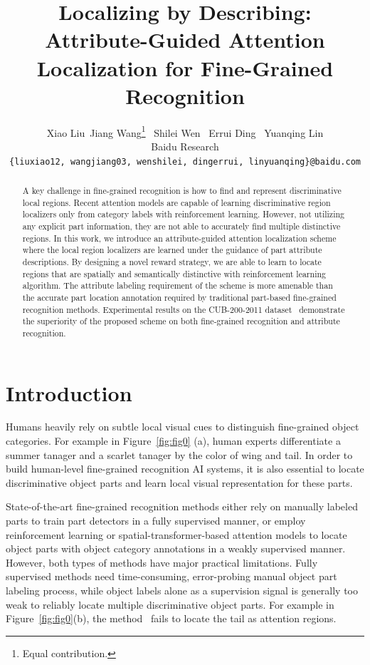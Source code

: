 \documentclass{article}
\title{Localizing by Describing: Attribute-Guided Attention Localization for Fine-Grained Recognition}
\author{
  Xiao Liu\footnotemark[1] \hspace{0.15in}~Jiang Wang\thanks{Equal contribution.}\hspace{0.15in} ~Shilei Wen\hspace{0.15in} ~Errui Ding \hspace{0.15in}  ~Yuanqing Lin\\
  Baidu Research\\
  \texttt{\{liuxiao12, wangjiang03, wenshilei, dingerrui, linyuanqing\}@baidu.com} \\
}
\begin{document}

\maketitle

\setlength{\textfloatsep}{8pt}

\begin{abstract}
A key challenge in fine-grained recognition is how to find and represent discriminative local regions.
Recent attention models are capable of learning discriminative region localizers only from category labels with reinforcement learning. However, not utilizing any explicit part information, they are not able to accurately find multiple distinctive regions.
In this work, we introduce an attribute-guided attention localization scheme where the local region localizers are learned under the guidance of part attribute descriptions.
By designing a novel reward strategy, we are able to learn to locate regions that are spatially and semantically distinctive with reinforcement learning algorithm. The attribute labeling requirement of the scheme is more amenable than the accurate part location annotation required by traditional part-based fine-grained recognition methods.
Experimental results on the CUB-200-2011 dataset~\cite{bd6} demonstrate the superiority of the proposed scheme on both fine-grained recognition and attribute recognition.
\end{abstract}

\section{Introduction}
Humans heavily rely on subtle local visual cues to distinguish fine-grained object categories.
For example in Figure~\ref{fig:fig0} (a), human experts differentiate a summer tanager and a scarlet tanager by the color of wing and tail.  In order to build human-level fine-grained recognition AI systems, it is also essential to locate discriminative object parts and learn local visual representation for these parts.

State-of-the-art fine-grained recognition methods \cite{bd11,bd13} either rely on manually labeled parts to train part detectors in a fully supervised manner, or employ reinforcement learning or spatial-transformer-based attention models \cite{bd3,nips1} to locate object parts with object category annotations in a weakly supervised manner. However, both types of methods have major practical limitations.
Fully supervised methods need time-consuming, error-probing manual object part labeling process, while object labels alone as a supervision signal is generally too weak to reliably locate multiple discriminative object parts.
For example in Figure~\ref{fig:fig0}(b), the method~\cite{nips1} fails to locate the tail as attention regions.
\end{document}
